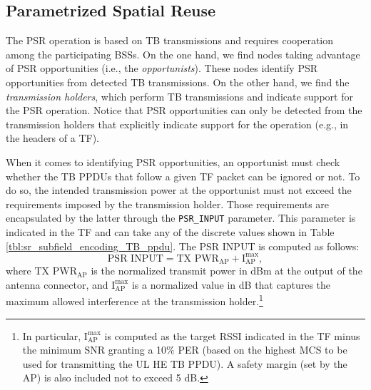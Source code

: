 \documentclass{article}
\begin{document}
\subsection{Parametrized Spatial Reuse}
\label{section:srp_based}	
The PSR operation is based on TB transmissions and requires cooperation among the participating BSSs. On the one hand, we find nodes taking advantage of PSR opportunities (i.e., the \emph{opportunists}). These nodes identify PSR opportunities from detected TB transmissions. On the other hand, we find the \emph{transmission holders}, which perform TB transmissions and indicate support for the PSR operation. Notice that PSR opportunities can only be detected from the transmission holders that explicitly indicate support for the operation (e.g., in the headers of a TF).

When it comes to identifying PSR opportunities, an opportunist must check whether the TB PPDUs that follow a given TF packet can be ignored or not. To do so, the intended transmission power at the opportunist must not exceed the requirements imposed by the transmission holder. Those requirements are encapsulated by the latter through the \texttt{PSR\_INPUT} parameter. This parameter is indicated in the TF and can take any of the discrete values shown in Table \ref{tbl:sr_subfield_encoding_TB_ppdu}. The PSR INPUT is computed as follows:
\begin{equation}
\text{PSR INPUT} = \text{TX PWR}_\text{AP} + \text{I}_\text{AP}^{\max},
\label{eq:srp_input}
\nonumber
\end{equation}
where $\text{TX PWR}_\text{AP}$ is the normalized transmit power in dBm at the output of the antenna connector, and $\text{I}_\text{AP}^{\max}$ is a normalized value in dB that captures the maximum allowed interference at the transmission holder.\footnote{In particular, $\text{I}_\text{AP}^{\max}$ is computed as the target RSSI indicated in the TF minus the minimum SNR granting a 10\% PER (based on the highest MCS to be used for transmitting the UL HE TB PPDU). A safety margin (set by the AP) is also included not to exceed 5 dB.}
\end{document}
